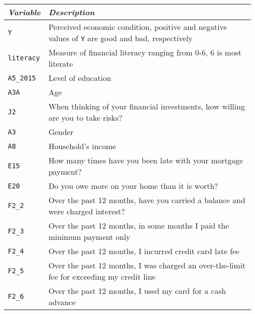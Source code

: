 \documentclass[11pt]{article}
\begin{document}
\vspace{1mm}
\begin{center}
\begin{tabular}{l p{}}
 \hline
\textit{Variable} & \textit{Description} \\
\hline
{\tt Y} &               Perceived economic condition, positive and negative values of {\tt Y} are good and bad, respectively \\
{\tt literacy} &           Measure of financial literacy ranging from 0-6, 6 is most literate \\
{\tt A5_2015} &           Level of education \\
{\tt A3A} &             Age \\
{\tt J2} &              When thinking of your financial investments, how willing are you to take risks?  \\
{\tt A3} &     Gender           \\
{\tt A8} &         Household's income       \\
{\tt E15} &       How many times have you been late with your mortgage payment?         \\
{\tt E20} &           Do you owe more on your home than it is worth?     \\
{\tt F2_2} &          Over the past 12 months, have you carried a balance and were charged interest?      \\
{\tt F2_3} &         Over the past 12 months, in some months I paid the minimum payment only       \\
{\tt F2_4} &        Over the past 12 months, I incurred credit card late fee        \\
{\tt F2_5} &          Over the past 12 months, I was charged an over-the-limit fee for exceeding my credit line      \\
{\tt F2_6} &        Over the past 12 months, I used my card for a cash advance        \\
\hline
\end{tabular}
\end{center}    
  
\end{document}
